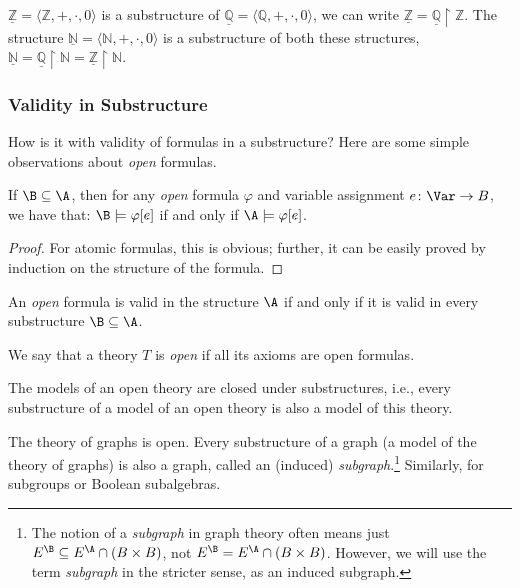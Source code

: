\begin{example}
    $\underline{\mathbb Z}=\langle\mathbb Z,+,\cdot,0\rangle$ is a substructure of $\underline{\mathbb Q}=\langle\mathbb Q,+,\cdot,0\rangle$, we can write $\underline{\mathbb Z}=\underline{\mathbb Q}\restriction\mathbb Z$. The structure $\underline{\mathbb N}=\langle \mathbb N,+,\cdot,0\rangle$ is a substructure of both these structures, $\underline{\mathbb N}=\underline{\mathbb Q}\restriction\mathbb N=\underline{\mathbb Z}\restriction\mathbb N$.
\end{example}

\subsubsection{Validity in Substructure}

How is it with validity of formulas in a substructure? Here are some simple observations about \emph{open} formulas.

\begin{observation}
    If $\B\subseteq\A$, then for any \emph{open} formula $\varphi$ and variable assignment $e\colon\Var\to B$, we have that: $\B\models\varphi[e]$ if and only if $\A\models\varphi[e]$.
\end{observation}
\begin{proof}
    For atomic formulas, this is obvious; further, it can be easily proved by induction on the structure of the formula.
\end{proof}

\begin{corollary}
    An \emph{open} formula is valid in the structure $\A$ if and only if it is valid in every substructure $\B\subseteq\A$.
\end{corollary}

We say that a theory $T$ is \emph{open} if all its axioms are open formulas.

\begin{corollary}
    The models of an open theory are closed under substructures, i.e., every substructure of a model of an open theory is also a model of this theory.
\end{corollary}

\begin{example}
    The theory of graphs is open. Every substructure of a graph (a model of the theory of graphs) is also a graph, called an (induced) \emph{subgraph}.\footnote{The notion of a \emph{subgraph} in graph theory often means just $E^\B\subseteq E^\A\cap (B\times B)$, not $E^\B=E^\A\cap (B\times B)$. However, we will use the term \emph{subgraph} in the stricter sense, as an induced subgraph.} Similarly, for subgroups or Boolean subalgebras.
\end{example}

